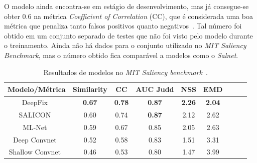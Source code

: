 \documentclass[11pt]{article}
\newcommand{\tit}[1]{\textit{#1}}
\newcommand{\tbf}[1]{\textbf{#1}}
\begin{document}
O modelo ainda encontra-se em estágio de desenvolvimento, mas já consegue-se
obter 0.6 na métrica \tit{Coefficient of Correlation} (CC), que é considerada
uma boa métrica que penaliza tanto falsos positivos quanto
negativos~\cite{ref:metrics}.
Tal número foi obtido em um conjunto separado de testes que não foi visto
pelo modelo durante o treinamento.
Ainda não há dados para o conjunto utilizado no \tit{MIT Saliency Benchmark},
mas o número obtido fica comparável a modelos como o
\tit{Salnet}.

\begin{table}[H]
    \centering
    \caption{Resultados de modelos no \tit{MIT Saliency benchmark}~\cite{ref:mit300-bm}.}
    \begin{tabular}{|c|c|c|c|c|c|c|c|c|}
        \hline
        \tbf{Modelo/Métrica} & \tbf{Similarity} & \tbf{CC}
            & \tbf{AUC Judd} & \tbf{NSS} & \tbf{EMD}\\
        \hline
        DeepFix~\cite{ref:deepfix} & \tbf{0.67} & \tbf{0.78} &
            \tbf{0.87} & \tbf{2.26} & \tbf{2.04}\\
        \hline
        SALICON~\cite{ref:salicon} & 0.60 & 0.74 &
            \tbf{0.87} & 2.12 & 2.62\\
        \hline
        ML-Net~\cite{ref:mlnet} & 0.59 & 0.67 &  0.85 & 2.05 & 2.63\\
        \hline
        Deep Convnet~\cite{ref:shallow-deep} & 0.52 & 0.58 &  0.83 &
            1.51 & 3.31\\
        \hline
        Shallow Convnet~\cite{ref:shallow-deep} & 0.46 & 0.53 &  0.80
            & 1.47 & 3.99\\
        \hline
    \end{tabular}
\end{table}
\end{document}
